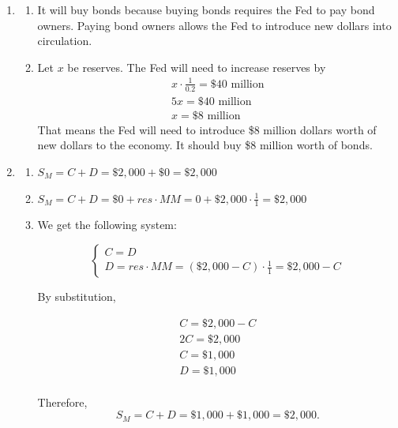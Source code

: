 \documentclass{article}
\begin{document}
\begin{enumerate}
\item

	\begin{enumerate}
	
	\item It will buy bonds because buying bonds requires the Fed to pay bond owners. Paying bond owners allows the Fed to introduce new dollars into circulation.
	
	\item Let $x$ be reserves. The Fed will need to increase reserves by
		\begin{gather*}
		x \cdot \frac{1}{0.2} = \$40 \text{ million} \\
		5x = \$40 \text{ million} \\
		x = \$8 \text{ million}
		\end{gather*}
		That means the Fed will need to introduce \$8 million dollars worth of new dollars to the economy. It should buy \$8 million worth of bonds. 
	
	\end{enumerate}
	
\item 

	\begin{enumerate}
	
	\item $S_M = C + D = \$2,000 + \$0 = \$2,000$
	
	\item $S_M = C + D = \$0 + res \cdot MM = 0 + \$2,000 \cdot \frac{1}{1} = \$2,000$
	
	\item We get the following system:
	
		\begin{equation*}
		\begin{cases}
		C = D \\
		D = res \cdot MM = (\$2,000 - C) \cdot \frac{1}{1} = \$2,000 - C
		\end{cases}
		\end{equation*}
		
		By substitution,
		
		\begin{gather*}
		C = \$2,000 - C \\
		2C = \$2,000 \\
		C = \$1,000 \\
		D = \$1,000 \\
		\end{gather*}
		
		Therefore, \[S_M = C + D = \$1,000 + \$1,000 = \$2,000.\]
		

\end{enumerate}
\end{enumerate}
\end{document}
